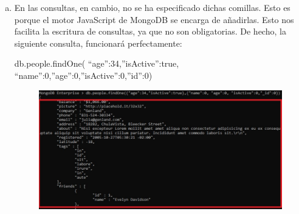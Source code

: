 \documentclass[preprint,12pt]{elsarticle}
\begin{document}
\begin{enumerate}[a)]
\item En las consultas, en cambio, no se ha especificado dichas comillas. Esto es porque el motor JavaScript de MongoDB se encarga de añadirlas. Esto nos facilita la escritura de consultas, ya que no son obligatorias. De hecho, la siguiente consulta, funcionará perfectamente:

db.people.findOne(\newline
{“age”:34,”isActive”:true},\newline
{“name”:0,”age”:0,”isActive”:0,”id”:0})\newline

\begin{figure}[htb]
	\begin{center}
		\includegraphics[width=15cm]{./IMAGENES/Mongo017}
	\end{center}
\end{figure}

\end{enumerate}
\end{document}
